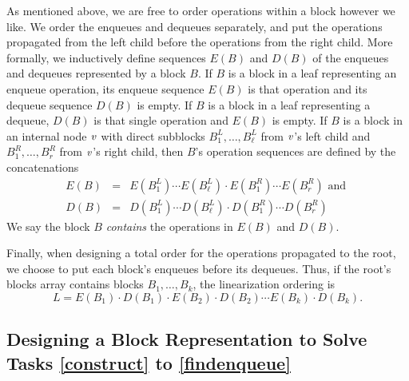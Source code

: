 As mentioned above, we are free to order operations within a block however we like.
We order the enqueues and dequeues separately, and put the 
operations propagated from the left child before the operations from the right child.
More formally, we inductively define sequences $E(B)$ and $D(B)$ of the enqueues and dequeues
represented by a block $B$.
If $B$ is a block in a leaf representing an enqueue operation, its enqueue sequence $E(B)$ is that operation
and its dequeue sequence $D(B)$ is empty.  If $B$ is a block in a leaf representing a dequeue, $D(B)$ is that single operation and $E(B)$ is empty.
If $B$ is a block in an internal node $\mbox{\textnormal{\textit{v}}}$ with direct subblocks $B^L_1, \ldots, B^L_\ell$ from 
$\mbox{\textnormal{\textit{v}}}$'s left child
and $B^R_1,\ldots,B^R_r$ from $\mbox{\textnormal{\textit{v}}}$'s right child, then $B$'s operation sequences are defined by the concatenations 
\begin{eqnarray}
E(B) &=& E(B^L_1)\cdots E(B^L_\ell)\cdot E(B^R_1) \cdots E(B^R_r) \mbox{ and }\nonumber\\
D(B) &=& D(B^L_1)\cdots D(B^L_\ell)\cdot D(B^R_1) \cdots D(B^R_r)\label{defSeqs}
\end{eqnarray}
We say the block $B$ \emph{contains} the operations in $E(B)$ and $D(B)$.

Finally, when designing a total order for the operations propagated to the root, we choose
to put each block's enqueues before its dequeues.
Thus, if the root's blocks array contains blocks $B_1, \ldots, B_k$, the 
linearization ordering is 
\begin{equation}
L=E(B_1)\cdot D(B_1) \cdot E(B_2) \cdot D(B_2) \cdots E(B_k) \cdot D(B_k).
\label{linearization}
\end{equation}

\subsection{Designing a Block Representation to Solve Tasks \ref{construct} to \ref{findenqueue}}
\label{sec:fields}

